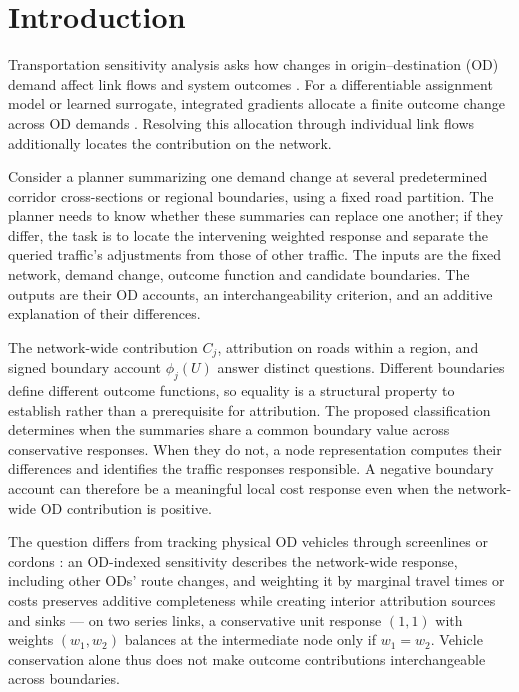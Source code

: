 \documentclass[a4paper,fleqn]{cas-sc}
\begin{document}
\section{Introduction}\label{sec:intro}
Transportation sensitivity analysis asks how changes in origin--destination
(OD) demand affect link flows and system outcomes
\citep{tobin1988sensitivity,josefsson2007sensitivity,patriksson2003aggregated}.
For a differentiable assignment model or learned surrogate, integrated
gradients allocate a finite outcome change across OD demands
\citep{sundararajan2017axiomatic}. Resolving this allocation through individual
link flows additionally locates the contribution on the network.

Consider a planner summarizing one demand change at several predetermined
corridor cross-sections or regional boundaries, using a fixed road partition.
The planner needs to know whether these summaries can replace one another;
if they differ, the task is to locate the intervening weighted response and
separate the queried traffic's adjustments from those of other traffic.
The inputs are the fixed network, demand change, outcome function and
candidate boundaries. The outputs are their OD accounts, an interchangeability
criterion, and an additive explanation of their differences.

The network-wide contribution $C_j$, attribution on roads within a region,
and signed boundary account $\phi_j(U)$ answer distinct questions.
Different boundaries define different outcome functions, so equality is a
structural property to establish rather than a prerequisite for attribution.
The proposed classification determines when the summaries share a common
boundary value across conservative responses. When they do not, a node
representation computes their differences and identifies the traffic
responses responsible. A negative boundary account can therefore be a
meaningful local cost response even when the network-wide OD contribution
is positive.

The question differs from tracking physical OD vehicles through screenlines
or cordons \citep{sheffi1985urban,vanzuylen1980most,bar2002origin}:
an OD-indexed sensitivity describes the network-wide response,
including other ODs' route changes, and weighting it by marginal
travel times or costs preserves additive completeness while creating
interior attribution sources and sinks --- on two series links, a
conservative unit response $(1,1)$ with weights $(w_1,w_2)$ balances
at the intermediate node only if $w_1=w_2$. Vehicle conservation
alone thus does not make outcome contributions interchangeable
across boundaries.
\end{document}
